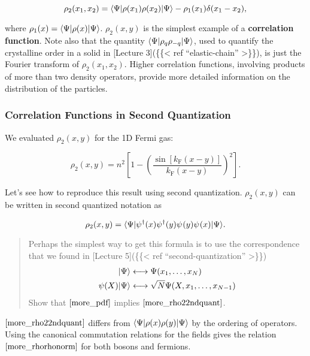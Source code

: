 \[
\rho_2(x_1,x_2) = \langle{\Psi}\rvert\rho(x_1)\rho(x_2)\lvert{\Psi}\rangle - \rho_1(x_1)\delta(x_1-x_2),
\label{more_rhorhonorm}
\]

where \(\rho_1(x)= \langle{\Psi}\rvert \rho(x) \lvert \Psi \rangle\). \(\rho_2(x,y)\) is
the simplest example of a \textbf{correlation function}. Note also that
the quantity \(\langle{\Psi}\rvert \rho_q \rho_{-q} \lvert{\Psi}\rangle\), used to
quantify the crystalline order in a solid in {[}Lecture
3{]}(\{\{\textless{} ref ``elastic-chain'' \textgreater\}\}), is just
the Fourier transform of \(\rho_2(x_1,x_2)\). Higher correlation
functions, involving products of more than two density operators,
provide more detailed information on the distribution of the particles.

\hypertarget{correlation-functions-in-second-quantization}{%
\subsubsection{Correlation Functions in Second
Quantization}\label{correlation-functions-in-second-quantization}}

We evaluated \(\rho_2(x,y)\) for the 1D Fermi gas:

\[
\rho_2(x,y) = n^2\left[1 - \left(\frac{\sin[k_\text{F}(x-y)]}{k_\text{F}(x-y)}\right)^2\right].
\label{more_rho2evalFermi}
\]

Let's see how to reproduce this result using second quantization.
\(\rho_2(x,y)\) can be written in second quantized notation as

\[
\rho_2(x,y) =\braket{\Psi}{\pdop(x)\pdop(y)\pop(y)\pop(x)}{\Psi}.
\label{more_rho22ndquant}
\]

\begin{quote}
Perhaps the simplest way to get this formula is to use the
correspondence that we found in {[}Lecture 5{]}(\{\{\textless{} ref
``second-quantization'' \textgreater\}\}) \[
\begin{align}
\lvert{\Psi}\rangle&\longleftrightarrow \Psi(x_1,\ldots, x_N)\nonumber\\
\psi(X)\lvert{\Psi}\rangle&\longleftrightarrow \sqrt{N}\Psi(X,x_1,\ldots, x_{N-1})\\
\end{align}
\] Show that \(\eqref{more_pdf}\) implies \(\eqref{more_rho22ndquant}\).
\end{quote}

\(\eqref{more_rho22ndquant}\) differs from
\(\langle{\Psi}\rvert\rho(x)\rho(y)\lvert{\Psi}\rangle\) by the ordering of operators.
Using the canonical commutation relations for the fields gives the
relation \(\eqref{more_rhorhonorm}\) for both bosons and fermions.

